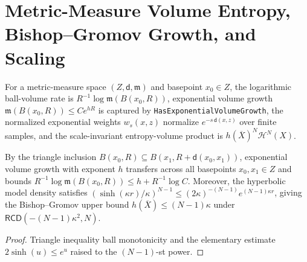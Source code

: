 
\chapter{Metric-Measure Volume Entropy, Bishop--Gromov Growth, and Scaling}

\begin{definition}
\label{def_mm_volume_entropy}
\leanok
For a metric-measure space $(Z, \mathsf{d}, \mathfrak{m})$ and basepoint $x_0 \in Z$, the logarithmic ball-volume rate is $R^{-1} \log \mathfrak{m}(B(x_0, R))$, exponential volume growth $\mathfrak{m}(B(x_0, R)) \le C e^{h R}$ is captured by \texttt{HasExponentialVolumeGrowth}, the normalized exponential weights $w_s(x, z)$ normalize $e^{-s\,\mathsf{d}(x, z)}$ over finite samples, and the scale-invariant entropy-volume product is $h(\overline{X})^N \mathcal{H}^N(X)$.
\end{definition}

\begin{theorem}
\label{thm_basepoint_bishop_gromov}
\leanok
{}
By the triangle inclusion $B(x_0, R) \subseteq B(x_1, R + \mathsf{d}(x_0, x_1))$, exponential volume growth with exponent $h$ transfers across all basepoints $x_0, x_1 \in Z$ and bounds $R^{-1}\log\mathfrak{m}(B(x_0, R)) \le h + R^{-1}\log C$. Moreover, the hyperbolic model density satisfies $(\sinh(\kappa r)/\kappa)^{N-1} \le (2\kappa)^{-(N-1)} e^{(N-1)\kappa r}$, giving the Bishop--Gromov upper bound $h(\overline{X}) \le (N-1)\kappa$ under $\mathsf{RCD}(-(N-1)\kappa^2, N)$.
\end{theorem}
\begin{proof}\leanok Triangle inequality ball monotonicity and the elementary estimate $2\sinh(u) \le e^u$ raised to the $(N-1)$-st power.\end{proof}

